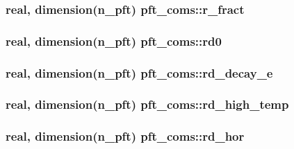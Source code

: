 \subsubsection[{\texorpdfstring{r\+\_\+fract}{r_fract}}]{\setlength{\rightskip}{0pt plus 5cm}real, dimension(n\+\_\+pft) pft\+\_\+coms\+::r\+\_\+fract}\hypertarget{namespacepft__coms_a588d74ddc11417f923b20d000e0740aa}{}\label{namespacepft__coms_a588d74ddc11417f923b20d000e0740aa}
\subsubsection[{\texorpdfstring{rd0}{rd0}}]{\setlength{\rightskip}{0pt plus 5cm}real, dimension(n\+\_\+pft) pft\+\_\+coms\+::rd0}\hypertarget{namespacepft__coms_a52c1f01cac447b99de69af116c709b08}{}\label{namespacepft__coms_a52c1f01cac447b99de69af116c709b08}
\subsubsection[{\texorpdfstring{rd\+\_\+decay\+\_\+e}{rd_decay_e}}]{\setlength{\rightskip}{0pt plus 5cm}real, dimension(n\+\_\+pft) pft\+\_\+coms\+::rd\+\_\+decay\+\_\+e}\hypertarget{namespacepft__coms_abc5e92f122fd2ebab52069105e512fa5}{}\label{namespacepft__coms_abc5e92f122fd2ebab52069105e512fa5}
\subsubsection[{\texorpdfstring{rd\+\_\+high\+\_\+temp}{rd_high_temp}}]{\setlength{\rightskip}{0pt plus 5cm}real, dimension(n\+\_\+pft) pft\+\_\+coms\+::rd\+\_\+high\+\_\+temp}\hypertarget{namespacepft__coms_a1bcf4f8ef5012e5ea47b2e5deb6dae4a}{}\label{namespacepft__coms_a1bcf4f8ef5012e5ea47b2e5deb6dae4a}
\subsubsection[{\texorpdfstring{rd\+\_\+hor}{rd_hor}}]{\setlength{\rightskip}{0pt plus 5cm}real, dimension(n\+\_\+pft) pft\+\_\+coms\+::rd\+\_\+hor}\hypertarget{namespacepft__coms_aa082b314a2092d3ee2b63f30cd1fc8be}{}\label{namespacepft__coms_aa082b314a2092d3ee2b63f30cd1fc8be}
